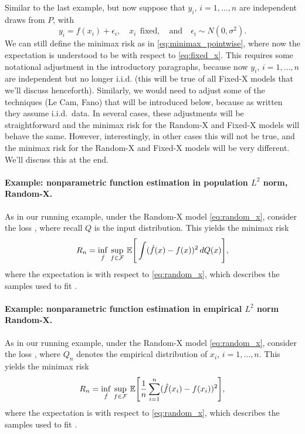 \documentclass{article}
\begin{document}
Similar to the last example, but now suppose that $y_i$, $i=1,\dots,n$ are
independent draws from $P$, with    
\begin{equation}
\label{eq:fixed_x}
y_i = f(x_i) + \epsilon_i, \quad x_i \;\, \text{fixed}, \quad \text{and} \quad
\epsilon_i \sim N(0,\sigma^2).
\end{equation}
We can still define the minimax risk as in \eqref{eq:minimax_pointwise}, where
now the expectation is understood to be with respect to \eqref{eq:fixed_x}. This 
requires some notational adjustment in the introductory paragraphs, because now
$y_i$, $i=1,\dots,n$ are independent but no longer i.i.d. (this will be true of
all Fixed-X models that we'll discuss henceforth). Similarly, we would need to  
adjust some of the techniques (Le Cam, Fano) that will be introduced below,
because as written they assume i.i.d.\ data. In several cases, these adjustments
will be straightforward and the minimax risk for the Random-X and Fixed-X models
will behave the same. However, interestingly, in other cases this will not be
true, and the minimax risk for the Random-X and Fixed-X models will be very
different. We'll discuss this at the end.

\paragraph{Example: nonparametric function estimation in population $L^2$ norm,
  Random-X.}  

As in our running example, under the Random-X model \eqref{eq:random_x},
consider the loss , where recall $Q$
is the input distribution. This yields the minimax risk     
\begin{equation}
\label{eq:minimax_population}
R_n = \inf_{\hat{f}} \, \sup_{f \in \mathcal{F}} \, \mathbb{E}\Bigg[ \int (\hat{f}(x) - f(x))^2 \, dQ(x)
\Bigg],   
\end{equation}
where the expectation is with respect to \eqref{eq:random_x}, which describes
the samples used to fit \smash{$\hf$}.  

\paragraph{Example: nonparametric function estimation in empirical $L^2$ norm
  Random-X.}  

As in our running example, under the Random-X model \eqref{eq:random_x},
consider the loss , where $Q_n$
denotes the empirical distribution of $x_i$, $i=1,\dots,n$. This yields the
minimax risk     
\begin{equation}
\label{eq:minimax_empirical}
R_n = \inf_{\hat{f}} \, \sup_{f \in \mathcal{F}} \, \mathbb{E}\Bigg[ \frac{1}{n} \sum_{i=1}^n
(\hat{f}(x_i) - f(x_i))^2 \Bigg], 
\end{equation}
where the expectation is with respect to \eqref{eq:random_x}, which describes
the samples used to fit \smash{$\hf$}.  
\end{document}
